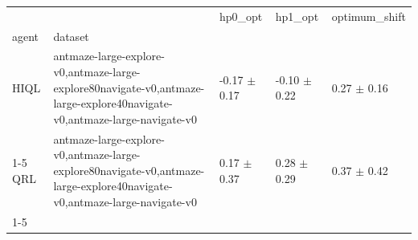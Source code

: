 \begin{tabular}{lllll}
\toprule
 &  & hp0_opt & hp1_opt & optimum_shift \\
agent & dataset &  &  &  \\
\midrule
HIQL & antmaze-large-explore-v0,antmaze-large-explore80navigate-v0,antmaze-large-explore40navigate-v0,antmaze-large-navigate-v0 & -0.17 $\pm$ 0.17 & -0.10 $\pm$ 0.22 & 0.27 $\pm$ 0.16 \\
\cline{1-5}
QRL & antmaze-large-explore-v0,antmaze-large-explore80navigate-v0,antmaze-large-explore40navigate-v0,antmaze-large-navigate-v0 & 0.17 $\pm$ 0.37 & 0.28 $\pm$ 0.29 & 0.37 $\pm$ 0.42 \\
\cline{1-5}
\bottomrule
\end{tabular}
